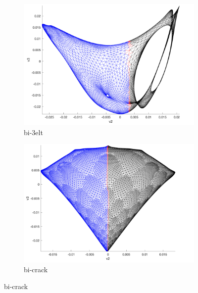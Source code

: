 \documentclass[unicode,11pt,a4paper,oneside,numbers=endperiod,openany]{scrartcl}
\begin{document}
\begin{figure}[htbp]
    \centering
    
    \begin{subfigure}[b]{0.4\textwidth}
        \includegraphics[width=\textwidth]{images/bi-3elt.png}
        \caption{bi-3elt}
    \end{subfigure}
    \hfill
    \begin{subfigure}[b]{0.4\textwidth}
        \includegraphics[width=\textwidth]{images/bi-crack.png}
        \caption{bi-crack} 
    \end{subfigure}
    
\end{figure}
\end{document}
